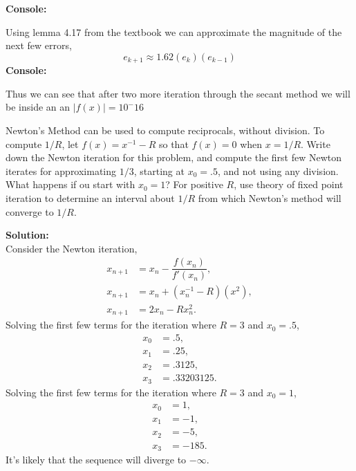 \documentclass[12pt]{article}
\makeatletter
\theoremstyle{homework}
\newenvironment{exercise}[1]
{\def\@currentlabel{#1}\exercisecore}
{\endexercisecore}
\newcommand{\localhead}[1]{\par\smallskip\noindent\textbf{#1}\nobreak\\}%
\newcommand\solution{\localhead{Solution:}}
\makeatother
\begin{document}
\textbf{Console:}

Using lemma 4.17 from the textbook we can approximate the magnitude of the next few errors,
\begin{equation*}
  e_{k+1}\approx 1.62(e_k)(e_{k-1})
\end{equation*}
\textbf{Console:}

Thus we can see that after two more iteration through the secant method we will be inside an an $|f(x)| = 10^-16$ 




\begin{exercise}{Chapter 4: 3} Newton's Method can be used to compute reciprocals, without division. To compute $1/R$,
  let $f(x) = x^{-1} - R$ so that $f(x) = 0$ when $x = 1/R$. Write down the Newton iteration for this problem, and compute the 
  first few Newton iterates for approximating $1/3$, starting at $x_0 = .5$, and not using any division. What happens if ou start with
  $x_0 = 1$? For positive $R$, use theory of fixed point iteration to determine an interval about $1/R$ from which Newton's method will converge to 
  $1/R$.


  \solution Consider the Newton iteration, 
  \begin{align*}
    x_{n+1} &= x_n - \dfrac{f(x_n)}{f'(x_n)},\\
    x_{n+1} &= x_n + (x_n^{-1} - R)(x^2),\\
    x_{n+1} &= 2x_n - Rx_n^2.
  \end{align*}
Solving the first few terms for the iteration where $R = 3$ and $x_0 = .5$,
\begin{align*}
  x_0 &= .5,\\
  x_1 &= .25,\\
  x_2 &= .3125,\\
  x_3 &= .33203125.
\end{align*}
Solving the first few terms for the iteration where $R = 3$ and $x_0 = 1$,
\begin{align*}
  x_0 &= 1,\\
  x_1 &= -1,\\
  x_2 &= -5,\\
  x_3 &= -185.
\end{align*}
It's likely that the sequence will diverge to $-\infty$.\\


\end{exercise}
\end{document}
